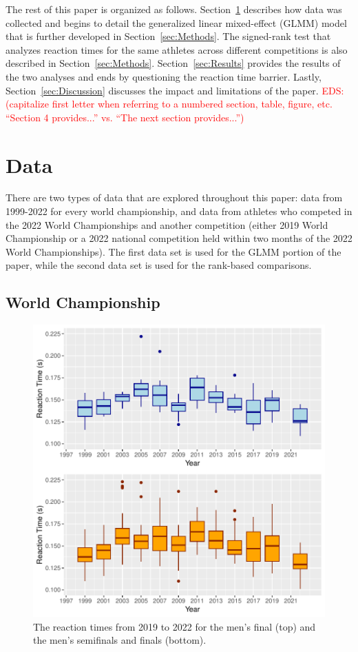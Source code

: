 \documentclass[12pt, letterpaper, titlepage]{article}
\newcommand{\eds}[1]{\textcolor{red}{EDS: (#1)}}
\begin{document}
The rest of this paper is organized as follows. Section~\ref{sec:Data} describes 
how data was collected and begins to detail the generalized linear mixed-effect 
(GLMM) model that is further developed in Section~\ref{sec:Methods}. The 
signed-rank test that analyzes reaction times for the same athletes across
different competitions is
also described in Section~\ref{sec:Methods}.  Section~\ref{sec:Results}
 provides the results of the two analyses and ends 
by questioning the reaction time barrier.  Lastly, Section~\ref{sec:Discussion}
discusses the impact and limitations of the paper.
\eds{capitalize first letter when referring to a numbered section, table, figure, 
etc. ``Section 4 provides...'' vs. ``The next section provides...''}


\section{Data} \label{sec:Data}

There are two types of data that are explored throughout this paper: data from
1999-2022 for every world championship, and data from athletes who competed in
the 2022 World Championships and another competition (either 2019 World 
Championship or a 2022 national competition held within two months of the  
2022 World Championships). The first data set is used for the GLMM portion
of the paper, while the second data set is used for the rank-based comparisons.

\subsection{World Championship}


\begin{figure}[tbp]
  \centering
  \includegraphics{Finals_Pooled_Boxplot}
  \caption{The reaction times from 2019 to 2022 for the men's final (top) and
  the men's semifinals and finals (bottom).}
  \label{fig:Boxplots}
\end{figure}
\end{document}
